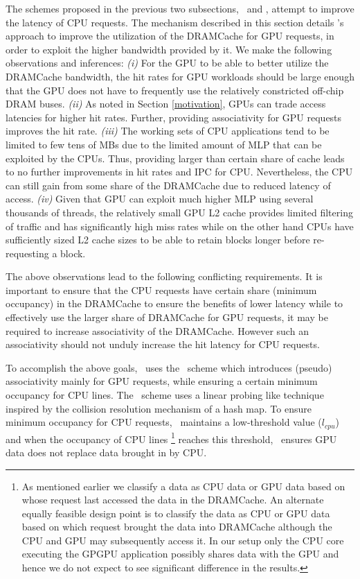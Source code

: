 The schemes proposed in the previous two subsections, \prioname\ and \bypassname, attempt to improve the latency of CPU requests. The mechanism described in this section details \cachename's approach to improve the utilization of the DRAMCache for GPU requests, in order to exploit the higher bandwidth provided by it. We make the following observations and inferences: \textit{(i)} For the GPU to be able to better utilize the DRAMCache bandwidth, the hit rates for GPU workloads should be large enough that the GPU does not have to frequently use the relatively constricted off-chip DRAM buses. \textit{(ii)} As noted in Section \ref{motivation}, GPUs can trade access latencies for higher hit rates. Further, providing associativity for GPU requests improves the hit rate. \textit{(iii)} The working sets of CPU applications tend to be limited to few tens of MBs due to the limited amount of MLP that can be exploited by the CPUs. Thus, providing larger than certain share of cache leads to no further improvements in hit rates and IPC for CPU. Nevertheless, the CPU can still gain from some share of the DRAMCache due to reduced latency of access. \textit{(iv)} Given that GPU can exploit much higher MLP using several thousands of threads, the relatively small GPU L2 cache provides limited filtering of traffic and has significantly high miss rates while on the other hand CPUs have sufficiently sized L2 cache sizes to be able to retain blocks longer before re-requesting a block.
\par The above observations lead to the following conflicting requirements. It is important to ensure that the CPU requests have certain share (minimum occupancy) in the DRAMCache to ensure the benefits of lower latency while to effectively use the larger share of DRAMCache for GPU requests, it may be required to increase  associativity of the DRAMCache. However such an associativity should not unduly increase the hit latency for CPU requests. 
\par To accomplish the above goals, \cachename\ uses the \chaining\ scheme which introduces (pseudo) associativity mainly for GPU requests, while ensuring a certain minimum occupancy for CPU lines. The \chaining\ scheme uses a linear probing like technique inspired by the collision resolution mechanism of a hash map. 
To ensure minimum occupancy for CPU requests, \chaining\ maintains a low-threshold value (\textit{$l_{cpu}$}) and when the occupancy of CPU lines
\footnote{As mentioned earlier we classify a data as CPU data or GPU data based on whose request last accessed the data in the DRAMCache. An alternate equally feasible design point is to classify the data as CPU or GPU data based on which request brought the data into DRAMCache although the CPU and GPU may subsequently access it. In our setup only the CPU core executing the GPGPU application possibly shares data with the GPU and hence we do not expect to see significant difference in the results.} 
reaches this threshold, \chaining\ ensures GPU data does not replace data brought in by CPU. 

